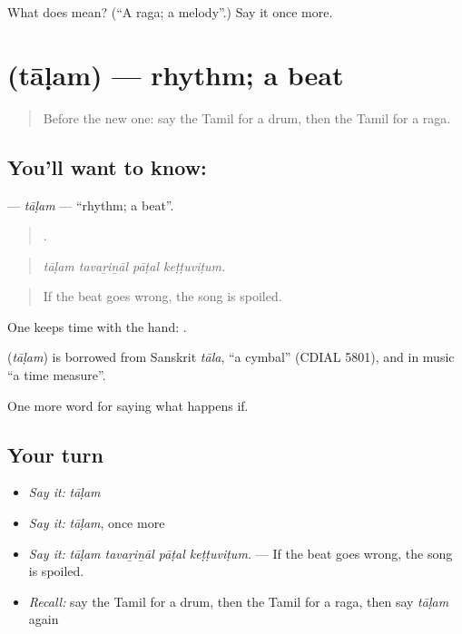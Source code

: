 \begin{tcolorbox}[breakable,colback=teal!4,colframe=teal!35!black,title={Before you move on}]
What does  mean? (\textquotedblleft{}A raga; a melody\textquotedblright{}.) Say it once more.
\end{tcolorbox}
\section[\texorpdfstring{\ta{தாளம்} (tāḷam)}{தாளம் (tāḷam)}]{ (tāḷam) — rhythm; a beat}

\label{lesson:TA-C558-talam}



\begin{quote}
Before the new one: say the Tamil for a drum, then the Tamil for a raga.
\end{quote}

\subsection*{You'll want to know: }
\textbf{} — \emph{tāḷam} — \textquotedblleft{}rhythm; a beat\textquotedblright{}.

\begin{quote}
   .
\end{quote}

\begin{quote}
\emph{tāḷam tavaṟiṉāl pāṭal keṭṭuviṭum.}
\end{quote}

\begin{quote}
If the beat goes wrong, the song is spoiled.
\end{quote}

One keeps time with the hand:  .

\begin{cousinweb}
\textbf{} (\emph{tāḷam}) is borrowed from Sanskrit \emph{tāla}, \textquotedblleft{}a cymbal\textquotedblright{} (CDIAL 5801), and in music \textquotedblleft{}a time measure\textquotedblright{}.
\end{cousinweb}

\begin{grammarlens}[title={What you've built}]
One more word for saying what happens if.
\end{grammarlens}

\subsection*{Your turn}
\begin{itemize}
\raggedright
  \item \emph{Say it:} \emph{tāḷam}
  \item \emph{Say it:} \emph{tāḷam}, once more
  \item \emph{Say it:} \emph{tāḷam tavaṟiṉāl pāṭal keṭṭuviṭum.} — If the beat goes wrong, the song is spoiled.
  \item \emph{Recall:} say the Tamil for a drum, then the Tamil for a raga, then say \emph{tāḷam} again
\end{itemize}

